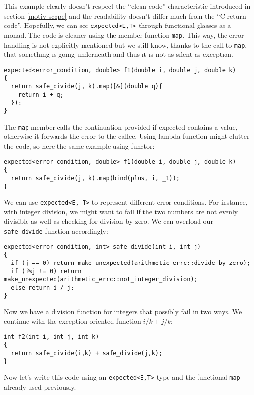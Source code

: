 \documentclass[a4paper,10pt]{article}
\newcommand{\cpp}[1]{\lstinline{#1}}
\begin{document}
\noindent
This example clearly doesn't respect the ``clean code'' characteristic introduced in section \ref{motiv-scope} and the readability doesn't differ much from the ``C return code''. Hopefully, we can see \cpp{expected<E,T>} through functional glasses as a monad. The code is cleaner using the member function \cpp{map}. This way, the error handling is not explicitly mentioned but we still know, thanks to the call to \cpp{map}, that something is going underneath and thus it is not as silent as exception.

\begin{lstlisting}
expected<error_condition, double> f1(double i, double j, double k)
{
  return safe_divide(j, k).map([&](double q){
    return i + q;
  });
}
\end{lstlisting}

The \cpp{map} member calls the continuation provided if expected contains a value, otherwise it forwards the error to the callee. Using lambda function might clutter the code, so here the same example using functor:

\begin{lstlisting}
expected<error_condition, double> f1(double i, double j, double k)
{
  return safe_divide(j, k).map(bind(plus, i, _1));
}
\end{lstlisting}

We can use \cpp{expected<E, T>} to represent different error conditions. For instance, with integer division, we might want to fail if the two numbers are not evenly divisible as well as checking for division by zero. We can overload our \cpp{safe_divide} function accordingly:

\begin{lstlisting}
expected<error_condition, int> safe_divide(int i, int j)
{
  if (j == 0) return make_unexpected(arithmetic_errc::divide_by_zero); 
  if (i%j != 0) return make_unexpected(arithmetic_errc::not_integer_division);
  else return i / j;
}
\end{lstlisting}

Now we have a division function for integers that possibly fail in two ways. We continue with the exception-oriented function $i/k + j/k$:

\begin{lstlisting}
int f2(int i, int j, int k)
{
  return safe_divide(i,k) + safe_divide(j,k);
}
\end{lstlisting}

\noindent
Now let's write this code using an \cpp{expected<E,T>} type and the functional \cpp{map} already used previously.
\end{document}
